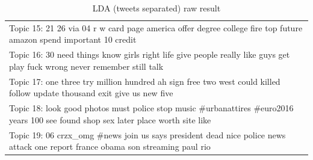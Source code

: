 \documentclass[11pt]{article}
\begin{document}
\begin{appendices}
\begin{table}
\begin{tabular}{|p{\linewidth}|}
    Topic 15: 21 26 via 04 r w card page america offer degree college fire top future amazon spend important 10 credit\\
    Topic 16: 30 need things know girls right life give people really like guys get play fuck wrong never remember still talk\\
    Topic 17: one three try million hundred ah sign free two west could killed follow update thousand exit give us new five\\
    Topic 18: look good photos must police stop music \#urbanattires \#euro2016 years 100 see found shop sex later place worth site like\\
    Topic 19: 06 crzx\_omg \#news join us says president dead nice police news attack one report france obama son streaming paul rio\\
    \hline
    \end{tabular}
	\caption{LDA (tweets separated) raw result}
	\label{tb:res_lda_sep_raw}
\end{table}


\end{appendices}
\end{document}
